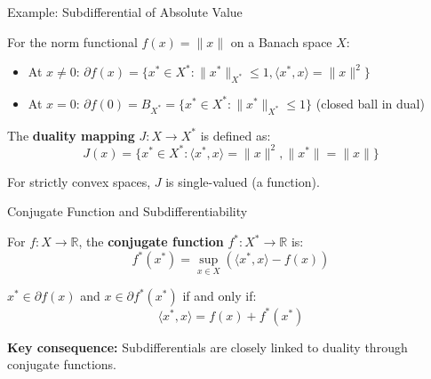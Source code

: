 \documentclass[aspectratio=169,10pt]{beamer}
\begin{document}
\begin{frame}[fragile]{Example: Subdifferential of Absolute Value}
  \begin{example}
    For the norm functional $f(x) = \|x\|$ on a Banach space $X$:
    \begin{itemize}
      \item At $x \neq 0$: $\partial f(x) = \{x^* \in X^*: \|x^*\|_{X^*} \leq 1, \langle x^*, x \rangle = \|x\|^2\}$

      \item At $x = 0$: $\partial f(0) = B_{X^*} = \{x^* \in X^*: \|x^*\|_{X^*} \leq 1\}$ (closed ball in dual)
    \end{itemize}
  \end{example}

  \begin{example}
    The \textbf{duality mapping} $J: X \to X^*$ is defined as:
    \[
      J(x) = \{x^* \in X^*: \langle x^*, x \rangle = \|x\|^2, \|x^*\| = \|x\|\}
    \]

    For strictly convex spaces, $J$ is single-valued (a function).
  \end{example}
\end{frame}

\begin{frame}{Conjugate Function and Subdifferentiability}
  \begin{definition}
    For $f: X \to \mathbb{R}$, the \textbf{conjugate function} $f^*: X^* \to \mathbb{R}$ is:
    \[
      f^*(x^*) = \sup_{x \in X} \left(\langle x^*, x \rangle - f(x)\right)
    \]
  \end{definition}

  \begin{theorem}
    $x^* \in \partial f(x)$ and $x \in \partial f^*(x^*)$ if and only if:
    \[
      \langle x^*, x \rangle = f(x) + f^*(x^*)
    \]
  \end{theorem}

  \textbf{Key consequence:} Subdifferentials are closely linked to duality through conjugate functions.
\end{frame}
\end{document}
